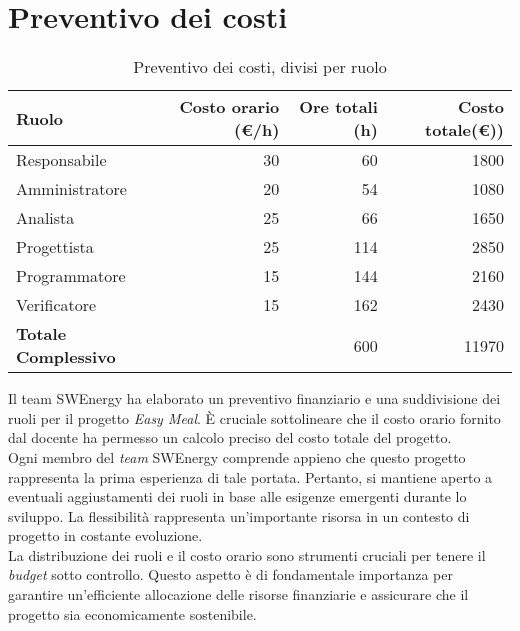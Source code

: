 \section{Preventivo dei costi}

\begin{table}[H]
	\renewcommand{\arraystretch}{1.5}
	\centering
	\begin{tabular}{l|r|r|r}
		\textbf{Ruolo} & \textbf{Costo orario (\euro/h)} & \textbf{Ore totali (h)} & 
		\textbf{Costo totale(\euro))} \\
		\hline
		Responsabile				&	 30 &  60 &	 1800			\\
		Amministratore				&	 20 &  54 &   1080  		\\
		Analista					&	 25 &  66 &  1650			\\
		Progettista					&	 25 &  114 &  2850			\\
		Programmatore				&	 15 & 144 &  2160			\\
		Verificatore				&	 15 & 162 &  2430			\\
		\hline
		\textbf{Totale Complessivo} &		& 600 &	11970			\\
	\end{tabular}
	\caption{Preventivo dei costi, divisi per ruolo}

\end{table}

Il team SWEnergy ha elaborato un preventivo finanziario e una suddivisione dei
ruoli per il progetto \textit{Easy Meal}. È cruciale  
sottolineare che il costo orario fornito dal docente ha permesso un calcolo 
preciso del costo totale del progetto. \\

\noindent
Ogni membro del \textit{team} SWEnergy comprende appieno che questo progetto 
rappresenta la prima esperienza di tale portata. Pertanto, si mantiene aperto 
a eventuali aggiustamenti dei ruoli in base alle esigenze emergenti durante lo sviluppo. 
La flessibilità rappresenta un'importante risorsa in un contesto di progetto in costante evoluzione. \\
La distribuzione dei ruoli e il costo orario sono strumenti cruciali per tenere il \textit{budget}  
sotto controllo. Questo aspetto è di fondamentale importanza per garantire un'efficiente 
allocazione delle risorse finanziarie e assicurare che il progetto sia economicamente sostenibile.
